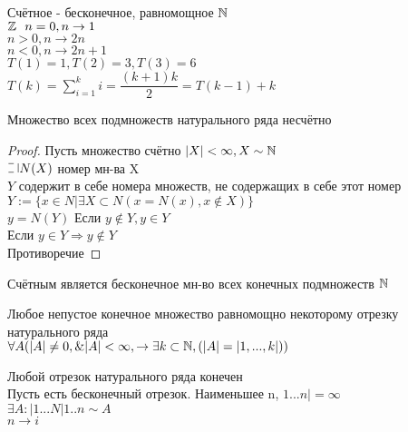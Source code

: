 Счётное - бесконечное, равномощное $\mathbb{N}$ \\
$ \mathbb{Z} \ \ n = 0, n \rightarrow 1 $ \\
$ n > 0, n \rightarrow 2n $ \\
$ n < 0, n \rightarrow 2n + 1 $ \\
$ T(1) = 1, T(2) = 3, T(3) = 6 $ \\
$ T(k) = \sum_{i=1}^{k} i = \dfrac{(k+1)k}{2} = T(k-1) + k $ \\
\begin{theorem}
	Множество всех подмножеств натурального ряда несчётно \\
	\begin{proof}
	Пусть множество счётно $ |X| < \infty, X \sim \mathbb{N} $ \\
	$ \letus N(X) $ номер мн-ва X \\
	$ Y $ содержит в себе номера множеств, не содержащих в себе этот номер \\
	$ Y := \{ x \in N | \exists X \subset N (x = N(x), x \notin X) \} $ \\
	$ y = N(Y) $ Если $y \notin Y, y \in Y $ \\
	Если $ y \in Y \Rightarrow y \notin Y $ \\
	Противоречие 
	\end{proof}
\end{theorem}
Счётным является бесконечное мн-во всех конечных подмножеств $\mathbb{N}$ \\
\begin{theorem}
	Любое непустое конечное множество равномощно некоторому отрезку натурального ряда \\
	$ \forall A ( |A| \neq 0, \& |A| < \infty, \rightarrow  \exists k \subset \mathbb{N}, (|A| = |1, ..., k|)) $\\
\end{theorem}
\begin{theorem}
	Любой отрезок натурального ряда конечен \\
	Пусть есть бесконечный отрезок.
	Наименьшее n, $ 1 ... n | = \infty $ \\
	$ \exists A : |1...N| 1..n \sim A $ \\
	$ n \rightarrow i $ \\
	
\end{theorem}
 
